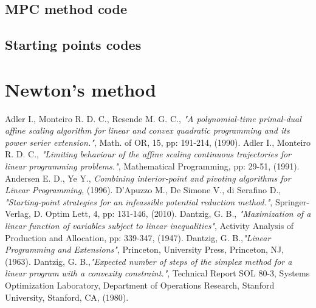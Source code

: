\documentclass[a4paper,10 pt,titlepage,twoside]{book}
\theoremstyle{plain}
\theoremstyle{definition}
\theoremstyle{remark}
\begin{document}
\section*{MPC method code}

\newpage
\section*{Starting points codes}
 
 
	\chapter*{Newton's method}
\begin{thebibliography}{9}
	
	
	 Adler I., Monteiro R. D. C., Resende M. G. C., \emph{ "A polynomial-time primal-dual affine scaling algorithm for linear and convex quadratic programming and its power serier extension."}, Math. of OR, 15, pp: 191-214, (1990).
	 Adler I., Monteiro R. D. C., \emph{ "Limiting behaviour of the affine scaling continuous trajectories for linear programming problems."}, Mathematical Programming, pp: 29-51, (1991).
	 Andersen E. D., Ye Y.,  \textit{Combining interior-point and pivoting algorithms for Linear Programming}, (1996).
	 D'Apuzzo M., De Simone V., di Serafino D., \emph{ "Starting-point strategies for an infeassible potential reduction method."}, Springer-Verlag, D. Optim Lett, 4, pp: 131-146, (2010).
	Dantzig, G. B.,\textit{ "Maximization of a linear function of variables subject to linear
	inequalities"}, Activity Analysis of Production and Allocation, pp: 339-347, (1947).
	Dantzig, G. B.,\emph{\;"Linear Programming and Extensions"}, Princeton, University Press, Princeton, NJ, (1963).	
	Dantzig, G. B.,\emph{\;"Expected number of steps of the simplex method for a linear program with a convexity constraint."}, Technical Report SOL 80-3, Systems Optimization Laboratory, Department of Operations Research, Stanford University, Stanford, CA, (1980).
	
	

\end{thebibliography}
\end{document}
